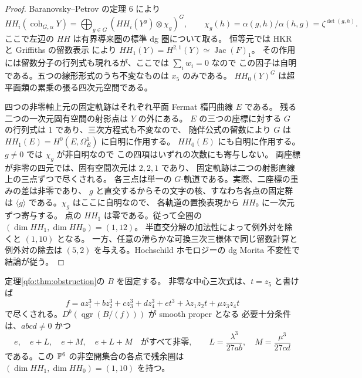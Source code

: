 \begin{proof}
Baranovsky--Petrov の定理 6 \cite{QFOBaranovskyPetrov} により
\[
 HH_i(\operatorname{coh}_{G,\alpha}Y)
 =\bigoplus_{g\in G}(HH_i(Y^g)\otimes\chi_g)^G,\qquad
 \chi_g(h)=\alpha(g,h)/\alpha(h,g)=\zeta^{\det(g,h)}.
\]
ここで左辺の $HH$ は有界導来圏の標準 dg 圏について取る。
恒等元では HKR と Griffiths の留数表示 \cite{QFOGriffiths} により
$HH_1(Y)=H^{2,1}(Y)\simeq\operatorname{Jac}(F)_1$。
その作用には留数分子の行列式も現れるが、ここでは $\sum_iw_i=0$ なので
この因子は自明である。五つの線形形式のうち不変なものは $x_5$ のみである。
$HH_0(Y)^G$ は超平面類の累乗の張る四次元空間である。

四つの非零軸上元の固定軌跡はそれぞれ平面 Fermat 楕円曲線 $E$ である。
残る二つの一次元固有空間の射影点は $Y$ の外にある。
$E$ の三つの座標に対する $G$ の行列式は $1$ であり、三次方程式も不変なので、
随伴公式の留数により $G$ は $HH_1(E)=H^0(E,\Omega_E^1)$ に自明に作用する。
$HH_0(E)$ にも自明に作用する。$g\ne0$ では $\chi_g$ が非自明なので
この四項はいずれの次数にも寄与しない。
両座標が非零の四元では、固有空間次元は $2,2,1$ であり、
固定軌跡は二つの射影直線上の三点ずつで尽くされる。
各三点は単一の $G$-軌道である。実際、二座標の重みの差は非零であり、
$g$ と直交するからその文字の核、すなわち各点の固定群は
$\langle g\rangle$ である。$\chi_g$ はここに自明なので、
各軌道の置換表現から $HH_0$ に一次元ずつ寄与する。
点の $HH_1$ は零である。従って全圏の $(\dim HH_1,\dim HH_0)=(1,12)$。
半直交分解の加法性によって例外対を除くと $(1,10)$ となる。
一方、任意の滑らかな可換三次三様体で同じ留数計算と例外対の除去は
$(5,2)$ を与える。Hochschild ホモロジーの dg Morita 不変性で結論が従う。
\end{proof}


\begin{corollary}[固定した量子多項式環の全中心三次商]
\label{qfo:cor:central-family}
定理\ref{qfo:thm:obstruction}の $B$ を固定する。
非零な中心三次式は、$t=z_5$ と書けば
\[
 f=a z_1^3+b z_2^3+c z_3^3+d z_4^3+e t^3
       +\lambda z_1z_2t+\mu z_3z_4t
\]
で尽くされる。$D^b(\operatorname{qgr}(B/(f)))$ が smooth proper となる
必要十分条件は、$abcd\ne0$ かつ
\[
 e,\quad e+L,\quad e+M,\quad e+L+M\quad\text{がすべて非零},
 \qquad L=\frac{\lambda^3}{27ab},\quad M=\frac{\mu^3}{27cd}
\]
である。この $\mathbb P^6$ の非空開集合の各点で残余圏は
$(\dim HH_1,\dim HH_0)=(1,10)$ を持つ。
\end{corollary}

